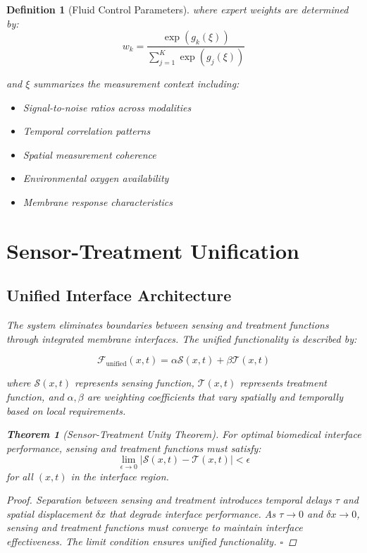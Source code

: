 \documentclass[12pt,a4paper]{article}
\newtheorem{theorem}{Theorem}
\newtheorem{definition}{Definition}
\begin{document}
\begin{definition}[Fluid Control Parameters]
where expert weights are determined by:
\begin{equation}
w_k = \frac{\exp(g_k(\xi))}{\sum_{j=1}^{K} \exp(g_j(\xi))}
\end{equation}

and $\xi$ summarizes the measurement context including:
\begin{itemize}
\item Signal-to-noise ratios across modalities
\item Temporal correlation patterns
\item Spatial measurement coherence
\item Environmental oxygen availability
\item Membrane response characteristics
\end{itemize}

\section{Sensor-Treatment Unification}

\subsection{Unified Interface Architecture}

The system eliminates boundaries between sensing and treatment functions through integrated membrane interfaces. The unified functionality is described by:

\begin{equation}
\mathcal{F}_{\text{unified}}(x,t) = \alpha \mathcal{S}(x,t) + \beta \mathcal{T}(x,t)
\end{equation}

where $\mathcal{S}(x,t)$ represents sensing function, $\mathcal{T}(x,t)$ represents treatment function, and $\alpha, \beta$ are weighting coefficients that vary spatially and temporally based on local requirements.

\begin{theorem}[Sensor-Treatment Unity Theorem]
For optimal biomedical interface performance, sensing and treatment functions must satisfy:
\begin{equation}
\lim_{\epsilon \to 0} |\mathcal{S}(x,t) - \mathcal{T}(x,t)| < \epsilon
\end{equation}
for all $(x,t)$ in the interface region.
\end{theorem}

\begin{proof}
Separation between sensing and treatment introduces temporal delays $\tau$ and spatial displacement $\delta x$ that degrade interface performance. As $\tau \to 0$ and $\delta x \to 0$, sensing and treatment functions must converge to maintain interface effectiveness. The limit condition ensures unified functionality. $\square$
\end{proof}


\end{definition}
\end{document}
